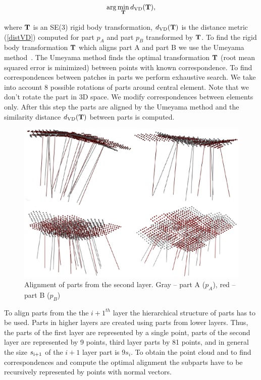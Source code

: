 \documentclass[letterpaper,10pt,conference]{ieeeconf}  %
\begin{document}
\begin{equation}
\label{optVI}
 \arg\min_{\bf T} d_{\rm VD}({\bf T}),
\end{equation}

where ${\bf T}$ is an SE(3) rigid body transformation, $d_{\rm VD}({\bf T})$ is the distance metric (\ref{distVD}) computed for part $p_A$ and part $p_B$ transformed by ${\bf T}$. To find the rigid body transformation ${\bf T}$ which aligns part A and part B we use the Umeyama method~\cite{Umeyama1991}. The Umeyama method finds the optimal transformation ${\bf T}$ (root mean squared error is minimized) between points with known correspondence. To find correspondences between patches in parts we perform exhaustive search. We take into account 8 possible rotations of parts around central element. Note that we don't rotate the part in 3D space. We modify correspondences between elements only. After this step the parts are aligned by the Umeyama method and the similarity distance $d_{\rm VD}({\bf T})$ between parts is computed. 

\begin{figure}[t]
 \centering
 \includegraphics[width=0.95\columnwidth]{../images/parts2ndLayer.eps}
 \caption{Alignment of parts from the second layer. Gray -- part A ($p_A$), red -- part B ($p_B$)}
 \label{parts2ndLayer}
\end{figure}

To align parts from the the $i+1^{th}$ layer the hierarchical structure of parts has to be used. Parts in higher layers are created using parts from lower layers. Thus, the parts of the first layer are represented by a single point, parts of the second layer are represented by 9 points, third layer parts by 81 points, and in general the size $s_{\rm i+1}$ of the $i+1$ layer part is $9s_i$. To obtain the point cloud and to find correspondences and compute the optimal alignment the subparts have to be recursively represented by points with normal vectors.
\end{document}
